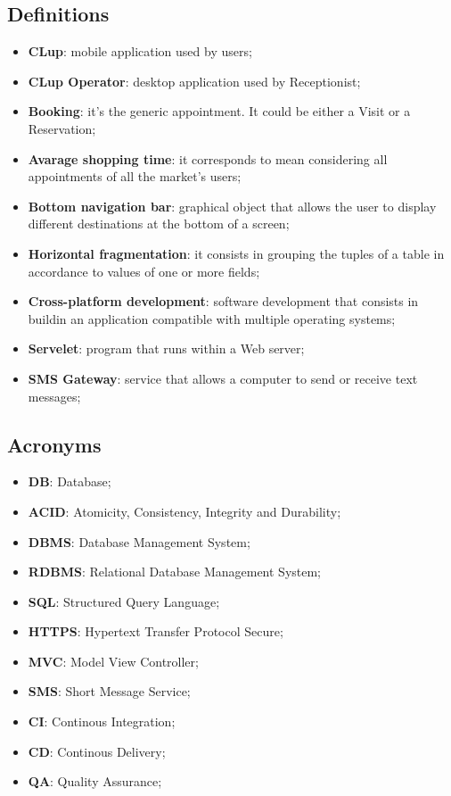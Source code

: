 \subsection{Definitions}
\begin{itemize}
\item \textbf{CLup}: mobile application used by users;
\item \textbf{CLup Operator}: desktop application used by Receptionist;
\item \textbf{Booking}: it's the generic appointment. It could be either a Visit or a Reservation;
\item \textbf{Avarage shopping time}: it corresponds to mean considering all appointments of all the market's users; 
\item \textbf{Bottom navigation bar}: graphical object that allows the user to display different destinations at the bottom of a screen;
\item \textbf{Horizontal fragmentation}: it consists in grouping the tuples of a table in accordance to values of one or more fields;
\item \textbf{Cross-platform development}: software development that consists in buildin an application compatible with multiple operating systems;
\item \textbf{Servelet}: program that runs within a Web server;
\item \textbf{SMS Gateway}: service that allows a computer to send or receive text messages; 
\end{itemize}
\subsection{Acronyms}
\begin{itemize}
\item \textbf{DB}: Database;
\item \textbf{ACID}: Atomicity, Consistency, Integrity and Durability;
\item \textbf{DBMS}: Database Management System;
\item \textbf{RDBMS}: Relational Database Management System;
\item \textbf{SQL}: Structured Query Language;
\item \textbf{HTTPS}: Hypertext Transfer Protocol Secure;
\item \textbf{MVC}: Model View Controller;
\item \textbf{SMS}: Short Message Service;
\item \textbf{CI}: Continous Integration;
\item \textbf{CD}: Continous Delivery;
\item \textbf{QA}: Quality Assurance;
\end{itemize}



